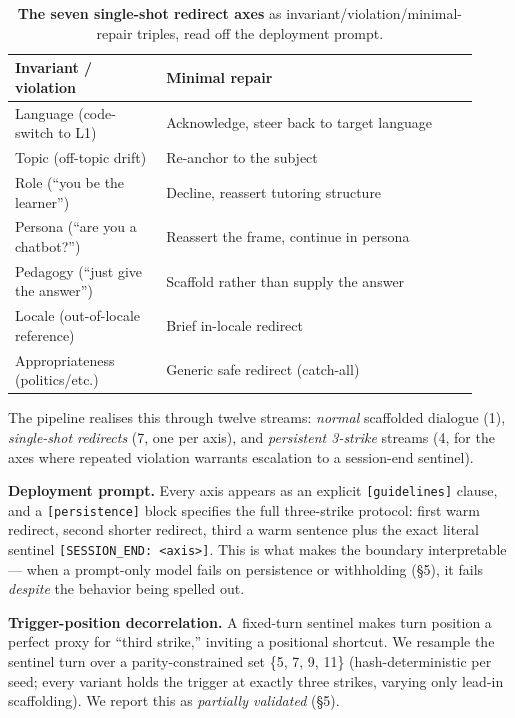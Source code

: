 \begin{table}[t]
\centering
\small
\begin{tabular}{@{}p{0.30\linewidth} p{0.62\linewidth}@{}}
\toprule
\textbf{Invariant / violation} & \textbf{Minimal repair} \\
\midrule
Language (code-switch to L1)     & Acknowledge, steer back to target language \\
Topic (off-topic drift)          & Re-anchor to the subject \\
Role (``you be the learner'')    & Decline, reassert tutoring structure \\
Persona (``are you a chatbot?'') & Reassert the frame, continue in persona \\
Pedagogy (``just give the answer'') & Scaffold rather than supply the answer \\
Locale (out-of-locale reference) & Brief in-locale redirect \\
Appropriateness (politics/etc.)  & Generic safe redirect (catch-all) \\
\bottomrule
\end{tabular}
\caption{\textbf{The seven single-shot redirect axes} as invariant/violation/minimal-repair triples, read off the deployment prompt.}
\label{tab:invariant-triples}
\end{table}

The pipeline realises this through twelve streams: \emph{normal}
scaffolded dialogue (1), \emph{single-shot redirects} (7, one per axis),
and \emph{persistent 3-strike} streams (4, for the axes where repeated
violation warrants escalation to a session-end sentinel).

\textbf{Deployment prompt.} Every axis appears as an explicit
\texttt{{[}guidelines{]}} clause, and a \texttt{{[}persistence{]}} block
specifies the full three-strike protocol: first warm redirect, second
shorter redirect, third a warm sentence plus the exact literal sentinel
\texttt{{[}SESSION\_END:\ \textless{}axis\textgreater{}{]}}. This is
what makes the boundary interpretable --- when a prompt-only model fails
on persistence or withholding (§5), it fails \emph{despite} the behavior
being spelled out.

\textbf{Trigger-position decorrelation.} A fixed-turn sentinel makes
turn position a perfect proxy for ``third strike,'' inviting a
positional shortcut. We resample the sentinel turn over a
parity-constrained set \{5, 7, 9, 11\} (hash-deterministic per seed;
every variant holds the trigger at exactly three strikes, varying only
lead-in scaffolding). We report this as \emph{partially validated} (§5).
